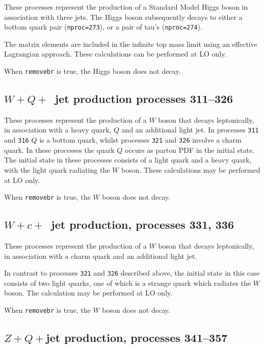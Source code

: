 \documentclass[12pt]{article}
\begin{document}
These processes represent the production of a Standard Model Higgs boson
in association with three jets. The Higgs boson
subsequently decays to either a bottom quark pair ({\tt nproc=273}), 
or a pair of tau's ({\tt nproc=274}).

The matrix elements are included in the infinite top mass limit
using an effective Lagrangian approach. These calculations can be
performed at LO only.

When {\tt removebr} is true, the Higgs boson does not decay.

\subsection{$W+Q+$~jet production processes 311--326}
\label{subsec:wQj}

These processes represent the production of a $W$
boson that decays leptonically,
in association with a heavy quark, $Q$ and an additional light jet. In
processes {\tt 311} and {\tt 316} $Q$ is a bottom quark, whilst
processes {\tt 321} and {\tt 326} involve a charm quark.
In these processes the quark $Q$ occurs as parton PDF in the initial state. 
The initial state in these processes consists of a light quark and a heavy 
quark, with the light quark radiating the $W$ boson. These calculations may
be performed at LO only.

When {\tt removebr} is true, the $W$ boson does not decay.

\subsection{$W+c+$~jet production, processes 331, 336}
\label{subsec:wcj}

These processes represent the production of a $W$
boson that decays leptonically,
in association with a charm quark and an additional light jet. 

In contrast to processes {\tt 321} and {\tt 326} described above, the initial
state in this case consists of two light quarks, one of which is a
strange quark which radiates the $W$ boson. The calculation may
be performed at LO only.

When {\tt removebr} is true, the $W$ boson does not decay.

\subsection{$Z+Q+$jet production, processes 341--357}
\label{subsec:ZQj}
\end{document}
